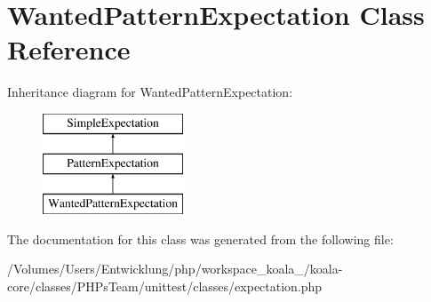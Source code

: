\hypertarget{class_wanted_pattern_expectation}{
\section{WantedPatternExpectation Class Reference}
\label{class_wanted_pattern_expectation}
}
Inheritance diagram for WantedPatternExpectation:\begin{figure}[H]
\begin{center}
\leavevmode
\includegraphics[height=3.000000cm]{class_wanted_pattern_expectation}
\end{center}
\end{figure}


The documentation for this class was generated from the following file:\begin{DoxyCompactItemize}
\item 
/Volumes/Users/Entwicklung/php/workspace\_\-koala\_/koala-\/core/classes/PHPsTeam/unittest/classes/expectation.php\end{DoxyCompactItemize}
